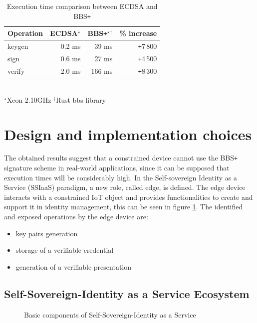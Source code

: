 \begin{table}[!h]
    \centering
    \begin{tabular}{| l || r | r | r|}
        \hline 
        \textbf{Operation} & \textbf{ECDSA}$^\star$ & \textbf{BBS\texttt{+}}$^\star$$^\dagger$ & \textbf{\% increase} \\ [0.5ex] 
        \hline  \hline 
        keygen   & 0.2   ms      & 39 ms   &\texttt{+}7\,800\\
        \hline
        sign     & 0.6   ms      & 27  ms   &\texttt{+}4\,500\\
        \hline
        verify   & 2.0  ms         & 166 ms   &\texttt{+}8\,300\\
        \hline
    \end{tabular}
    \\
    \footnotesize $^\star$Xeon 2.10GHz \enspace\enspace $^\dagger$Rust bbs library
    \caption{Execution time comparison between ECDSA and BBS\texttt{+}}
    \label{time-table2}
\end{table}

\section{Design and implementation choices}
The obtained results suggest that a constrained device cannot use the BBS\texttt{+} signature scheme in real-world applications, since it can be supposed that execution times will be considerably high. In the Self-sovereign Identity as a Service (SSIaaS) paradigm, a new role,  called edge, is defined. The edge device interacts with a constrained IoT object and provides functionalities to create and support it in identity management, this can be seen in figure \ref{poc-design}. The identified and exposed operations by the edge device are:
\begin{itemize}
    \item key pairs generation
    \item storage of a verifiable credential
    \item generation of a verifiable presentation
\end{itemize}

\subsection{Self-Sovereign-Identity as a Service Ecosystem}

\begin{figure}[!h]
    \centering
    
    \caption{Basic components of Self-Sovereign-Identity as a Service}
    \label{poc-design}
\end{figure}

